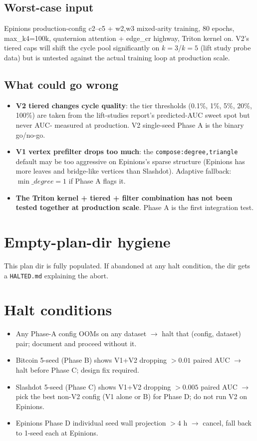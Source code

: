 \documentclass[11pt,a4paper]{article}
\begin{document}
\subsection*{Worst-case input}
Epinions production-config c2--c5 + w2,w3 mixed-arity training,
80 epochs, max\_k4=100k, quaternion attention + edge\_cr highway,
Triton kernel on.  V2's tiered caps will shift the cycle pool
significantly on $k{=}3$/$k{=}5$ (lift study probe data) but is
untested against the actual training loop at production scale.

\subsection*{What could go wrong}
\begin{itemize}
\item \textbf{V2 tiered changes cycle quality}: the tier
  thresholds (0.1\%, 1\%, 5\%, 20\%, 100\%) are taken from the
  lift-studies report's predicted-AUC sweet spot but never AUC-
  measured at production.  V2 single-seed Phase A is the
  binary go/no-go.
\item \textbf{V1 vertex prefilter drops too much}: the
  \texttt{compose:degree,triangle} default may be too aggressive
  on Epinions's sparse structure (Epinions has more leaves and
  bridge-like vertices than Slashdot).  Adaptive fallback:
  $\min\_degree=1$ if Phase A flags it.
\item \textbf{The Triton kernel + tiered + filter combination has
  not been tested together at production scale}.  Phase A is the
  first integration test.
\end{itemize}

\section{Empty-plan-dir hygiene}
This plan dir is fully populated.  If abandoned at any halt
condition, the dir gets a \texttt{HALTED.md} explaining the
abort.

\section{Halt conditions}
\begin{itemize}
\item Any Phase-A config OOMs on any dataset $\rightarrow$ halt
  that (config, dataset) pair; document and proceed without it.
\item Bitcoin 5-seed (Phase B) shows V1+V2 dropping $> 0.01$
  paired AUC $\rightarrow$ halt before Phase C; design fix
  required.
\item Slashdot 5-seed (Phase C) shows V1+V2 dropping $> 0.005$
  paired AUC $\rightarrow$ pick the best non-V2 config (V1 alone
  or B) for Phase D; do not run V2 on Epinions.
\item Epinions Phase D individual seed wall projection $> 4$ h
  $\rightarrow$ cancel, fall back to 1-seed each at Epinions.
\end{itemize}
\end{document}
